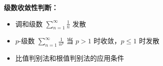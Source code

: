\documentclass{ctexart}
\newcommand{\important}[1]{\textcolor{crimsonred}{\textbf{#1}}}
\begin{document}
\begin{exercisebox}
\important{级数收敛性判断：}
\begin{itemize}[leftmargin=15pt, itemsep=5pt]
    \item 调和级数 $\sum_{n=1}^{\infty} \frac{1}{n}$ 发散
    \item $p$-级数 $\sum_{n=1}^{\infty} \frac{1}{n^p}$ 当 $p > 1$ 时收敛，$p \leq 1$ 时发散
    \item 比值判别法和根值判别法的应用条件
\end{itemize}
\end{exercisebox}

\setcounter{page}{150}
\end{document}
